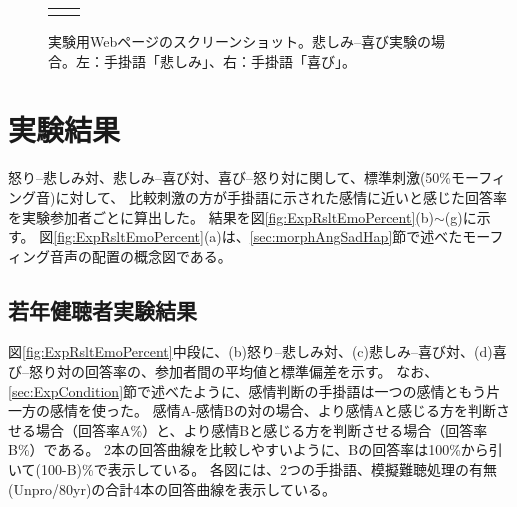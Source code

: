 \begin{figure}[h]
  \vspace{10pt}
  \begin{tabular}{cc}
  \begin{minipage} {0.47\hsize}
  \centering
  \includegraphics [ width = 1\columnwidth]{Figure/ExpAngHapSad/FigWeb_sad.eps}
  \end{minipage} & 
  
  \begin{minipage} {0.47\hsize}
  \centering
  \includegraphics [ width = 1\columnwidth]{Figure/ExpAngHapSad/FigWeb_hap.eps }
  \end{minipage}
  
  \end{tabular}
  
  \caption{実験用Webページのスクリーンショット。悲しみ--喜び実験の場合。左：手掛語「悲しみ」、右：手掛語「喜び」。
            }
  \label{fig:Expweb} 

\end{figure}


\newpage
\section{実験結果}
\label{sec:ResultAngSadHap}
怒り--悲しみ対、悲しみ--喜び対、喜び--怒り対に関して、標準刺激(50\%モーフィング音)に対して、
比較刺激の方が手掛語に示された感情に近いと感じた回答率を実験参加者ごとに算出した。
結果を図\ref{fig:ExpRsltEmoPercent}(b)$\sim$(g)に示す。
図\ref{fig:ExpRsltEmoPercent}(a)は、\ref{sec:morphAngSadHap}節で述べたモーフィング音声の配置の概念図である。


\subsection{若年健聴者実験結果}
図\ref{fig:ExpRsltEmoPercent}中段に、(b)怒り--悲しみ対、(c)悲しみ--喜び対、(d)喜び--怒り対の回答率の、参加者間の平均値と標準偏差を示す。
なお、\ref{sec:ExpCondition}節で述べたように、感情判断の手掛語は一つの感情ともう片一方の感情を使った。
感情A-感情Bの対の場合、より感情Aと感じる方を判断させる場合（回答率A\%）と、より感情Bと感じる方を判断させる場合（回答率B\%）である。
2本の回答曲線を比較しやすいように、Bの回答率は100\%から引いて(100-B)\%で表示している。
各図には、2つの手掛語、模擬難聴処理の有無(Unpro/80yr)の合計4本の回答曲線を表示している。

